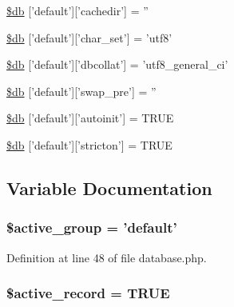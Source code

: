 \begin{DoxyCompactItemize}
\item 
\hyperlink{development_2database_8php_a12683252490249e3294aebaca97c4126}{\$db} \mbox{[}'default'\mbox{]}\mbox{[}'cachedir'\mbox{]} = ''
\item 
\hyperlink{development_2database_8php_a581bc2f1f3fa806239c44e2c2293dc59}{\$db} \mbox{[}'default'\mbox{]}\mbox{[}'char\-\_\-set'\mbox{]} = 'utf8'
\item 
\hyperlink{development_2database_8php_ab03697bf8340acfa74bf20c952aa81c7}{\$db} \mbox{[}'default'\mbox{]}\mbox{[}'dbcollat'\mbox{]} = 'utf8\-\_\-general\-\_\-ci'
\item 
\hyperlink{development_2database_8php_af35b6847ece1c0a956c97ebb90186e45}{\$db} \mbox{[}'default'\mbox{]}\mbox{[}'swap\-\_\-pre'\mbox{]} = ''
\item 
\hyperlink{development_2database_8php_a217a1c42eadc83da9cdd9e3d694e53fa}{\$db} \mbox{[}'default'\mbox{]}\mbox{[}'autoinit'\mbox{]} = T\-R\-U\-E
\item 
\hyperlink{development_2database_8php_a5722ababeee63dd26d82734e3fa83b7c}{\$db} \mbox{[}'default'\mbox{]}\mbox{[}'stricton'\mbox{]} = T\-R\-U\-E
\end{DoxyCompactItemize}


\subsection{Variable Documentation}
\hypertarget{development_2database_8php_a5046ea83a698c5b7bbf6ffd3dd816b65}{
\subsubsection[{\$active\-\_\-group}]{\setlength{\rightskip}{0pt plus 5cm}\$active\-\_\-group = 'default'}}\label{development_2database_8php_a5046ea83a698c5b7bbf6ffd3dd816b65}


Definition at line 48 of file database.\-php.

\hypertarget{development_2database_8php_a228b6ea91602f48a8831d0dc94809b94}{
\subsubsection[{\$active\-\_\-record}]{\setlength{\rightskip}{0pt plus 5cm}\$active\-\_\-record = T\-R\-U\-E}}\label{development_2database_8php_a228b6ea91602f48a8831d0dc94809b94}


